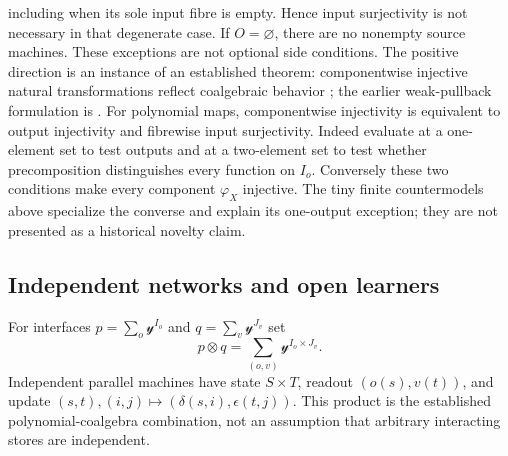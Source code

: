\documentclass[11pt]{article}
\theoremstyle{definition}
\theoremstyle{remark}\newtheorem{remark}[theorem]{Remark}
\begin{document}
including when its sole input fibre is empty. Hence input surjectivity is
not necessary in that degenerate case. If $O=\varnothing$, there are no
nonempty source machines. These exceptions are not optional side conditions.
The positive direction is an instance of an established theorem:
componentwise injective natural transformations reflect coalgebraic
behavior \cite[Lemma 4.6]{bonchi}; the earlier weak-pullback formulation
is \cite[Theorem 3.9]{bartels}. For polynomial maps, componentwise
injectivity is equivalent to output injectivity and fibrewise input
surjectivity. Indeed evaluate at a one-element set to test outputs and
at a two-element set to test whether precomposition distinguishes every
function on $I_o$. Conversely these two conditions make every component
$\varphi_X$ injective. The tiny finite countermodels above specialize the
converse and explain its one-output exception; they are not presented as
a historical novelty claim.



\subsection{Independent networks and open learners}\label{p:sec:networks}
For interfaces $p=\sum_o\mathcal y^{I_o}$ and
$q=\sum_v\mathcal y^{J_v}$ set
\[
 p\otimes q=\sum_{(o,v)}\mathcal y^{I_o\times J_v}.
\]
Independent parallel machines have state $S\times T$, readout
$(o(s),v(t))$, and update
$(s,t),(i,j)\mapsto(\delta(s,i),\epsilon(t,j))$.
This product is the established polynomial-coalgebra combination, not an
assumption that arbitrary interacting stores are independent.
\end{document}

